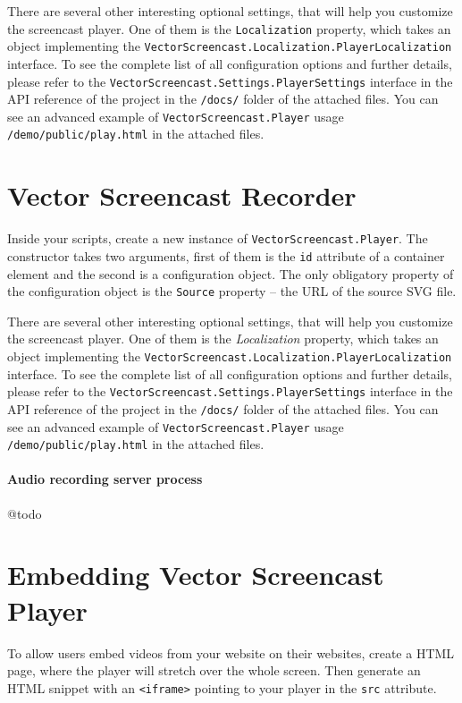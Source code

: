 There are several other interesting optional settings, that will help you customize the screencast player. One of them is the \verb|Localization| property, which takes an object implementing the \verb|VectorScreencast.Localization.PlayerLocalization| interface. To see the complete list of all configuration options and further details, please refer to the \verb|VectorScreencast.Settings.PlayerSettings| interface in the API reference of the project in the \verb|/docs/| folder of the attached files. You can see an advanced example of \verb|VectorScreencast.Player| usage \verb|/demo/public/play.html| in the attached files.

\section{Vector Screencast Recorder}

Inside your scripts, create a new instance of \verb|VectorScreencast.Player|. The constructor takes two arguments, first of them is the \verb|id| attribute of a container element and the second is a configuration object. The only obligatory property of the configuration object is the \verb|Source| property -- the URL of the source SVG file. 

There are several other interesting optional settings, that will help you customize the screencast player. One of them is the \textit{Localization} property, which takes an object implementing the \verb|VectorScreencast.Localization.PlayerLocalization| interface. To see the complete list of all configuration options and further details, please refer to the \verb|VectorScreencast.Settings.PlayerSettings| interface in the API reference of the project in the \verb|/docs/| folder of the attached files. You can see an advanced example of \verb|VectorScreencast.Player| usage \verb|/demo/public/play.html| in the attached files.

\paragraph{Audio recording server process}
@todo


\section{Embedding Vector Screencast Player}
To allow users embed videos from your website on their websites, create a HTML page, where the player will stretch over the whole screen. Then generate an HTML snippet with an \verb|<iframe>| pointing to your player in the \verb|src| attribute.

